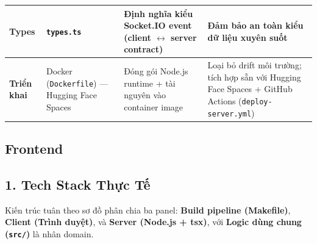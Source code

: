 \begin{longtable}{|p{2.5cm}|p{2.8cm}|p{4.5cm}|p{5.2cm}|}
\textbf{Types}
&
\texttt{types.ts}
&
Định nghĩa kiểu Socket.IO event (client $\leftrightarrow$ server contract)
&
Đảm bảo an toàn kiểu dữ liệu xuyên suốt
\\
\hline

\textbf{Triển khai}
&
Docker (\texttt{Dockerfile}) --- Hugging Face Spaces
&
Đóng gói Node.js runtime + tài nguyên vào container image
&
Loại bỏ drift môi trường; tích hợp sẵn với Hugging Face Spaces + GitHub Actions (\texttt{deploy-server.yml})
\\
\hline

\end{longtable}

\newpage

\subsection{Frontend}
\subsection*{1. Tech Stack Thực Tế}

Kiến trúc tuân theo sơ đồ phân chia ba panel:
\textbf{Build pipeline (Makefile)},
\textbf{Client (Trình duyệt)},
và \textbf{Server (Node.js + tsx)},
với \textbf{Logic dùng chung (\texttt{src/})} là nhân domain.

\renewcommand{\arraystretch}{1.3}

